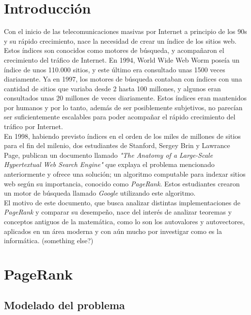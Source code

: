 \documentclass[%
    final,
    reprint,
    notitlepage,
    narroweqnarray,
    inline,
    twoside,
    invited
    ]{ieee}
\begin{document}
\section{Introducción}
Con el inicio de las telecomunicaciones masivas por Internet a principio de los 90s y su rápido crecimiento, nace la necesidad de 
crear un índice de los sitios web. Estos índices son conocidos como motores de búsqueda, y acompañaron el crecimiento del tráfico 
de Internet. En 1994, World Wide Web Worm poseía un índice de unos 110.000 sitios, y este último era consultado unas 1500 veces diariamente. Ya en 
1997, los motores de búsqueda contaban con índices con una cantidad de sitios que variaba desde 2 hasta 100 millones, y algunos eran consultados
unas  20 millones de veces diariamente. Estos índices eran mantenidos por humanos y por lo tanto, además de ser posiblemente subjetivos, 
no parecían ser suficientemente escalables para poder acompañar el rápido crecimiento del tráfico por Internet. \\
En 1998, habiendo previsto índices en el orden 
de los miles de millones de sitios para el fin del milenio, dos estudiantes de Stanford, Sergey Brin y Lawrance Page, publican un documento llamado 
\textit{"The Anatomy of a Large-Scale Hypertextual Web Search Engine"} que explaya el problema mencionado anteriormente y ofrece una solución; un 
algoritmo computable para indexar sitios web según su importancia, conocido como \textit{PageRank}. Estos estudiantes crearon un motor de búsqueda 
 llamado \textit{Google} utilizando este algoritmo. \\
El motivo de este documento, que busca analizar distintas implementaciones de \textit{PageRank}  y comparar su desempeño, nace del interés de analizar 
teoremas y conceptos antiguos de la matemática, como lo son los autovalores y autovectores, aplicados en un área moderna y con aún mucho por investigar 
como es la informática. (something else?)


\section{PageRank}

\subsection{Modelado del problema}
\end{document}
